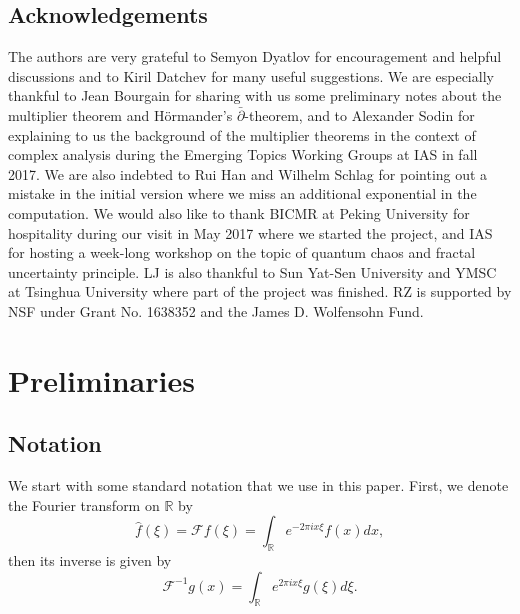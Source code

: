 \documentclass[reqno,12pt,letterpaper]{amsart}
\numberwithin{equation}{section}
\numberwithin{prop}{section}
\newcommand{\dbar}{\bar{\partial}}
\begin{document}


\subsection*{Acknowledgements}
The authors are very grateful to Semyon Dyatlov for encouragement and helpful discussions and to Kiril Datchev for many useful suggestions. We are especially thankful to Jean Bourgain for sharing with us some preliminary notes \cite{bourgain} about the multiplier theorem and H\"{o}rmander's $\dbar$-theorem, and to Alexander Sodin for explaining to us the background of the multiplier theorems in the context of complex analysis during the Emerging Topics Working Groups at IAS in fall 2017. We are also indebted to Rui Han and Wilhelm Schlag for pointing out a mistake in the initial version where we miss an additional exponential in the computation. We would also like to thank BICMR at Peking University for hospitality during our visit in May 2017 where we started the project, and IAS for hosting a week-long workshop on the topic of quantum chaos and fractal uncertainty principle. LJ is also thankful to Sun Yat-Sen University and YMSC at Tsinghua University where part of the project was finished. RZ is supported by NSF under Grant No. 1638352 and the James D. Wolfensohn Fund.


\section{Preliminaries}
\label{s:prelim}


\subsection{Notation}

We start with some standard notation that we use in this paper. First, we denote the Fourier transform on $\mathbb{R}$ by
\begin{equation*}
\widehat{f}(\xi)=\mathcal{F}f(\xi)=\int_{\mathbb{R}}e^{-2\pi ix\xi}f(x)dx,
\end{equation*}
then its inverse is given by
\begin{equation*}
\mathcal{F}^{-1}g(x)=\int_{\mathbb{R}}e^{2\pi ix\xi}g(\xi)d\xi.
\end{equation*}
\end{document}
